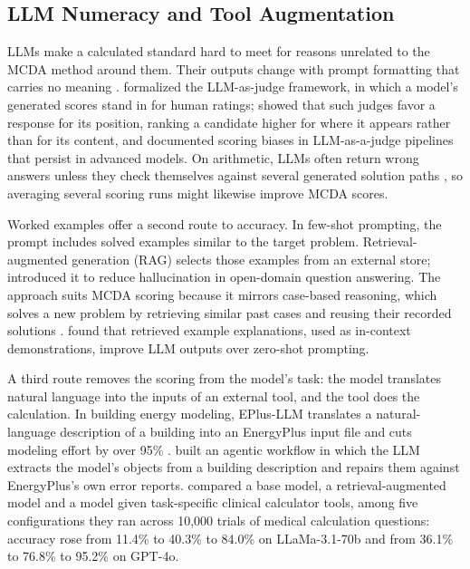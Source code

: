 \documentclass[final,3p,times]{elsarticle}
\begin{document}
\subsection{LLM Numeracy and Tool Augmentation}
\label{sec:lit-numeracy}

LLMs make a calculated standard hard to meet for reasons unrelated to the MCDA method around them. Their outputs change with prompt formatting that carries no meaning \cite{sclar2024promptsensitivity}. \citet{zheng2023judging} formalized the LLM-as-judge framework, in which a model's generated scores stand in for human ratings; \citet{wang2024fairescalers} showed that such judges favor a response for its position, ranking a candidate higher for where it appears rather than for its content, and \citet{li2026scoringbias} documented scoring biases in LLM-as-a-judge pipelines that persist in advanced models. On arithmetic, LLMs often return wrong answers unless they check themselves against several generated solution paths \cite{imani2023mathprompter}, so averaging several scoring runs might likewise improve MCDA scores.

Worked examples offer a second route to accuracy. In few-shot prompting, the prompt includes solved examples similar to the target problem. Retrieval-augmented generation (RAG) selects those examples from an external store; \citet{lewis2020} introduced it to reduce hallucination in open-domain question answering. The approach suits MCDA scoring because it mirrors case-based reasoning, which solves a new problem by retrieving similar past cases and reusing their recorded solutions \cite{aamodtplaza1994}. \citet{minorkaucher2024} found that retrieved example explanations, used as in-context demonstrations, improve LLM outputs over zero-shot prompting.

A third route removes the scoring from the model's task: the model translates natural language into the inputs of an external tool, and the tool does the calculation. In building energy modeling, EPlus-LLM translates a natural-language description of a building into an EnergyPlus input file and cuts modeling effort by over 95\% \cite{jiang2024eplus}. \citet{zhang2025agentic} built an agentic workflow in which the LLM extracts the model's objects from a building description and repairs them against EnergyPlus's own error reports. \citet{goodell2025} compared a base model, a retrieval-augmented model and a model given task-specific clinical calculator tools, among five configurations they ran across 10{,}000 trials of medical calculation questions: accuracy rose from 11.4\% to 40.3\% to 84.0\% on LLaMa-3.1-70b and from 36.1\% to 76.8\% to 95.2\% on GPT-4o.
\end{document}
